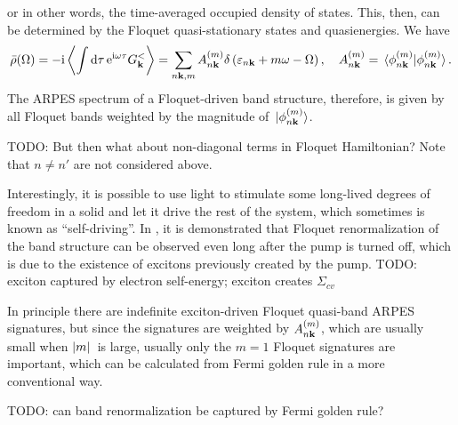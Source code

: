 \documentclass[hyperref, a4paper]{article}
\newcommand*{\ii}{\mathrm{i}}
\newcommand*{\ee}{\mathrm{e}}
\begin{document}
or in other words, the time-averaged occupied density of states.
This, then, can be determined by the Floquet quasi-stationary states and quasienergies.
We have \cite{rudner2020floquet}
\begin{equation}
    \bar{\rho}(\Omega) = - \ii \expval{\int \dd{\tau} \ee^{\ii \omega \tau} G^<_{\vb{k}}} 
    =\sum_{n \vb{k}, m} A_{n \vb{k}}^{(m)} \delta\left(\varepsilon_{n \vb{k}} +m \omega-\Omega\right), 
    \quad A_{n \vb{k}}^{(m)}= \braket*{\phi_{n \vb{k}}^{(m)}}{\phi_{n \vb{k}}^{(m)}}.
\end{equation}
The ARPES spectrum of a Floquet-driven band structure, therefore, 
is given by all Floquet bands weighted by the magnitude of $\ket*{\phi_{n \vb{k}}^{(m)}}$.

TODO: But then what about non-diagonal terms in Floquet Hamiltonian? Note that $n \neq n'$ are not considered above.

Interestingly, it is possible to use light to stimulate 
some long-lived degrees of freedom in a solid 
and let it drive the rest of the system, 
which sometimes is known as ``self-driving''.
In \cite{chan2023giant}, it is demonstrated that 
Floquet renormalization of the band structure can be observed 
even long after the pump is turned off, 
which is due to the existence of excitons previously created by the pump.
TODO: exciton captured by electron self-energy; 
exciton creates $\Sigma_{cv}$

In principle there are indefinite exciton-driven Floquet quasi-band ARPES signatures,
but since the signatures are weighted by $A^{(m)}_{n \vb{k}}$,
which are usually small when $\abs*{m}$ is large, 
usually only the $m=1$ Floquet signatures are important,
which can be calculated from Fermi golden rule in a more conventional way.

TODO: can band renormalization be captured by Fermi golden rule?

\printbibliography
\end{document}
